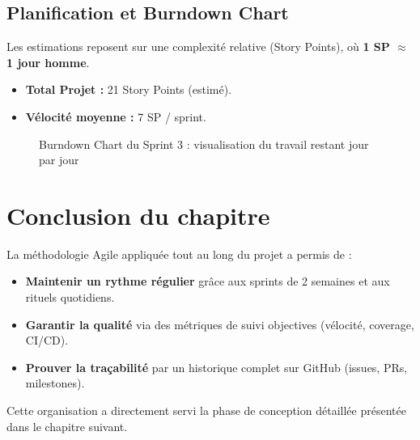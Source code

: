 \subsection{Planification et Burndown Chart}

Les estimations reposent sur une complexité relative (Story Points), où \textbf{1 SP $\approx$ 1 jour homme}.
\begin{itemize}
    \item \textbf{Total Projet :} 21 Story Points (estimé).
    \item \textbf{Vélocité moyenne :} 7 SP / sprint.
\end{itemize}

\begin{figure}[H]
    \centering
    \caption{Burndown Chart du Sprint 3 : visualisation du travail restant jour par jour}
    \label{fig:burndown}
\end{figure}

\section{Conclusion du chapitre}

La méthodologie Agile appliquée tout au long du projet a permis de :
\begin{itemize}
    \item \textbf{Maintenir un rythme régulier} grâce aux sprints de 2 semaines et aux rituels quotidiens.
    \item \textbf{Garantir la qualité} via des métriques de suivi objectives (vélocité, coverage, CI/CD).
    \item \textbf{Prouver la traçabilité} par un historique complet sur GitHub (issues, PRs, milestones).
\end{itemize}

Cette organisation a directement servi la phase de conception détaillée présentée dans le chapitre suivant.